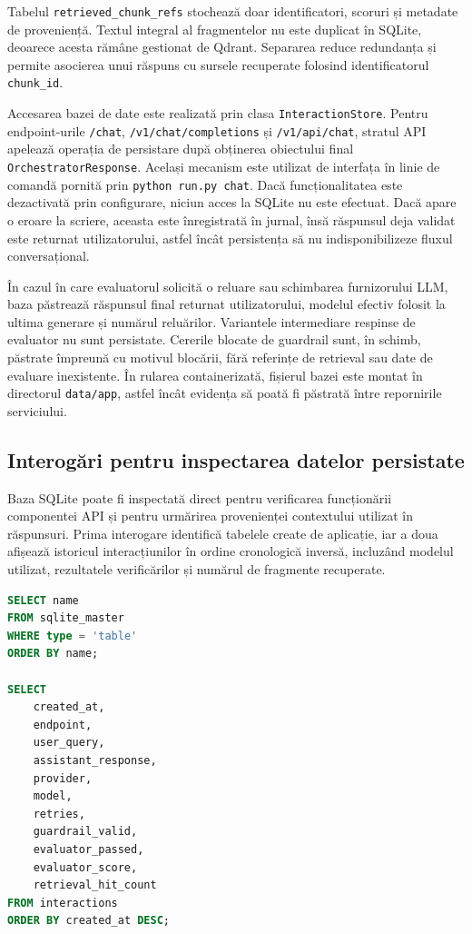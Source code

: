 \documentclass[12pt, a4paper, oneside, romanian]{teza-upb}
\begin{document}
Tabelul \texttt{retrieved\_chunk\_refs} stochează doar identificatori, scoruri și metadate de proveniență. Textul integral al fragmentelor nu este duplicat în SQLite, deoarece acesta rămâne gestionat de Qdrant. Separarea reduce redundanța și permite asocierea unui răspuns cu sursele recuperate folosind identificatorul \texttt{chunk\_id}.

Accesarea bazei de date este realizată prin clasa \texttt{InteractionStore}. Pentru endpoint-urile \texttt{/chat}, \texttt{/v1/chat/completions} și \texttt{/v1/api/chat}, stratul API apelează operația de persistare după obținerea obiectului final \texttt{OrchestratorResponse}. Același mecanism este utilizat de interfața în linie de comandă pornită prin \texttt{python run.py chat}. Dacă funcționalitatea este dezactivată prin configurare, niciun acces la SQLite nu este efectuat. Dacă apare o eroare la scriere, aceasta este înregistrată în jurnal, însă răspunsul deja validat este returnat utilizatorului, astfel încât persistența să nu indisponibilizeze fluxul conversațional.

În cazul în care evaluatorul solicită o reluare sau schimbarea furnizorului LLM, baza păstrează răspunsul final returnat utilizatorului, modelul efectiv folosit la ultima generare și numărul reluărilor. Variantele intermediare respinse de evaluator nu sunt persistate. Cererile blocate de guardrail sunt, în schimb, păstrate împreună cu motivul blocării, fără referințe de retrieval sau date de evaluare inexistente. În rularea containerizată, fișierul bazei este montat în directorul \texttt{data/app}, astfel încât evidența să poată fi păstrată între repornirile serviciului.

\subsection{Interogări pentru inspectarea datelor persistate}

Baza SQLite poate fi inspectată direct pentru verificarea funcționării componentei API și pentru urmărirea provenienței contextului utilizat în răspunsuri. Prima interogare identifică tabelele create de aplicație, iar a doua afișează istoricul interacțiunilor în ordine cronologică inversă, incluzând modelul utilizat, rezultatele verificărilor și numărul de fragmente recuperate.

\begin{center}
\begin{minipage}{0.64\textwidth}
\begin{lstlisting}[language=SQL, caption={Listarea tabelelor și inspectarea interacțiunilor persistate}]
SELECT name
FROM sqlite_master
WHERE type = 'table'
ORDER BY name;

SELECT
    created_at,
    endpoint,
    user_query,
    assistant_response,
    provider,
    model,
    retries,
    guardrail_valid,
    evaluator_passed,
    evaluator_score,
    retrieval_hit_count
FROM interactions
ORDER BY created_at DESC;
\end{lstlisting}
\end{minipage}
\end{center}
\end{document}
